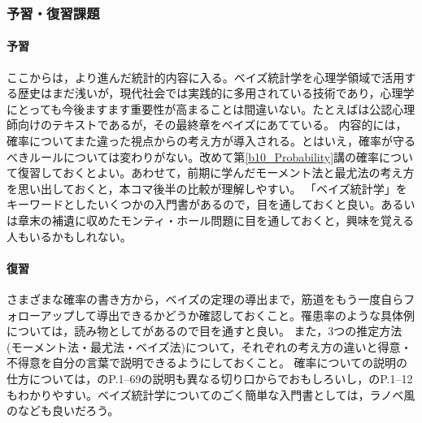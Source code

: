 \subsubsection{予習・復習課題}
\paragraph{予習}
ここからは，より進んだ統計的内容に入る。ベイズ統計学を心理学領域で活用する歴史はまだ浅いが，現代社会では実践的に多用されている技術であり，心理学にとっても今後ますます重要性が高まることは間違いない。たとえば\textcite{Nojima201903}は公認心理師向けのテキストであるが，その最終章をベイズにあてている。
内容的には，確率についてまた違った視点からの考え方が導入される。とはいえ，確率が守るべきルールについては変わりがない。改めて第\ref{b10_Probability}講の確率について復習しておくとよい。あわせて，前期に学んだモーメント法と最尤法の考え方を思い出しておくと，本コマ後半の比較が理解しやすい。
「ベイズ統計学」をキーワードとしたいくつかの入門書があるので，目を通しておくと良い。あるいは章末の補遺に収めたモンティ・ホール問題に目を通しておくと，興味を覚える人もいるかもしれない。
\paragraph{復習}
さまざまな確率の書き方から，ベイズの定理の導出まで，筋道をもう一度自らフォローアップして導出できるかどうか確認しておくこと。罹患率のような具体例については，読み物として\textcite{Gerd200309}があるので目を通すと良い。
また，3つの推定方法(モーメント法・最尤法・ベイズ法)について，それぞれの考え方の違いと得意・不得意を自分の言葉で説明できるようにしておくこと。
確率についての説明の仕方については，\textcite{Hiraoka200910}のP.1--69の説明も異なる切り口からでおもしろいし，\textcite{Ishida201801}のP.1--12もわかりやすい。ベイズ統計学についてのごく簡単な入門書としては，ラノベ風の\textcite{Ishida201902}なども良いだろう。
